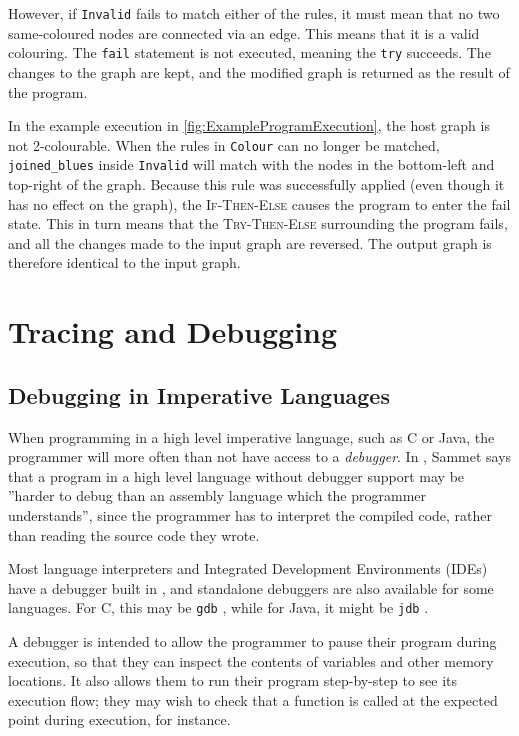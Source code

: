 \documentclass[authoryearcitations]{UoYCSproject}
\begin{document}
However, if \texttt{Invalid} fails to match either of the rules, it must mean
that no two same-coloured nodes are connected via an edge. This means that it is
a valid colouring. The \texttt{fail} statement is not executed, meaning the
\texttt{try} succeeds. The changes to the graph are kept, and the modified graph
is returned as the result of the program.

In the example execution in \autoref{fig:ExampleProgramExecution}, the host graph
is not 2-colourable. When the rules in \texttt{Colour} can no longer be matched,
\texttt{joined\_blues} inside \texttt{Invalid} will match with the nodes in the
bottom-left and top-right of the graph. Because this rule was successfully applied
(even though it has no effect on the graph), the \textsc{If-Then-Else} causes the
program to enter the fail state. This in turn means that the \textsc{Try-Then-Else}
surrounding the program fails, and all the changes made to the input graph are
reversed. The output graph is therefore identical to the input graph.


\section{Tracing and Debugging}
\label{sec:TracingAndDebugging}

\subsection{Debugging in Imperative Languages}
\label{sec:DebuggingInImperativeLanguages}

When programming in a high level imperative language, such as C or Java, the
programmer will more often than not have access to a \emph{debugger}. In
\citep{sammet1969}, Sammet says that a program in a high level language without
debugger support may be ''harder to debug than an assembly language which the
programmer understands'', since the programmer has to interpret the compiled code,
rather than reading the source code they wrote.

Most language interpreters and Integrated Development Environments (IDEs) have a
debugger built in \citep{scott2009}, and standalone debuggers are also available
for some languages. For C, this may be \texttt{gdb} \citep{gdbsite}, while for
Java, it might be \texttt{jdb} \citep{jdbsite}. 

A debugger is intended to allow the programmer to pause their program during
execution, so that they can inspect the contents of variables and other memory
locations. It also allows them to run their program step-by-step to see its
execution flow; they may wish to check that a function is called at the expected
point during execution, for instance.
\end{document}
